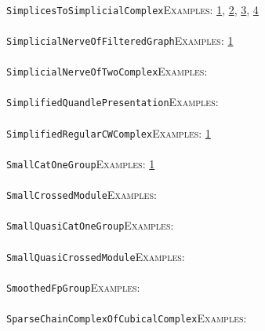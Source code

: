 \documentclass[a4paper,11pt]{report}
\begin{document}
{{ \\
 \texttt{SimplicesToSimplicialComplex}{\nobreakspace}{\nobreakspace}{\nobreakspace}{\nobreakspace}\textsc{Examples:} \href{tutorial/chap3.html} {1}{\nobreakspace}, \href{../www/SideLinks/About/aboutCoveringSpaces.html} {2}{\nobreakspace}, \href{../www/SideLinks/About/aboutCoverinSpaces.html} {3}{\nobreakspace}, \href{../www/SideLinks/About/aboutCubical.html} {4}{\nobreakspace} \\
 \\
 \texttt{SimplicialNerveOfFilteredGraph}{\nobreakspace}{\nobreakspace}{\nobreakspace}{\nobreakspace}\textsc{Examples:} \href{../www/SideLinks/About/aboutPersistent.html} {1}{\nobreakspace} \\
 \\
 \texttt{SimplicialNerveOfTwoComplex}{\nobreakspace}{\nobreakspace}{\nobreakspace}{\nobreakspace}\textsc{Examples:} \\
 \\
 \texttt{SimplifiedQuandlePresentation}{\nobreakspace}{\nobreakspace}{\nobreakspace}{\nobreakspace}\textsc{Examples:} \\
 \\
 \texttt{SimplifiedRegularCWComplex}{\nobreakspace}{\nobreakspace}{\nobreakspace}{\nobreakspace}\textsc{Examples:} \href{../www/SideLinks/About/aboutPeripheral.html} {1}{\nobreakspace} \\
 \\
 \texttt{SmallCatOneGroup}{\nobreakspace}{\nobreakspace}{\nobreakspace}{\nobreakspace}\textsc{Examples:} \href{../www/SideLinks/About/aboutquasi.html} {1}{\nobreakspace} \\
 \\
 \texttt{SmallCrossedModule}{\nobreakspace}{\nobreakspace}{\nobreakspace}{\nobreakspace}\textsc{Examples:} \\
 \\
 \texttt{SmallQuasiCatOneGroup}{\nobreakspace}{\nobreakspace}{\nobreakspace}{\nobreakspace}\textsc{Examples:} \\
 \\
 \texttt{SmallQuasiCrossedModule}{\nobreakspace}{\nobreakspace}{\nobreakspace}{\nobreakspace}\textsc{Examples:} \\
 \\
 \texttt{SmoothedFpGroup}{\nobreakspace}{\nobreakspace}{\nobreakspace}{\nobreakspace}\textsc{Examples:} \\
 \\
 \texttt{SparseChainComplexOfCubicalComplex}{\nobreakspace}{\nobreakspace}{\nobreakspace}{\nobreakspace}\textsc{Examples:} \\
}}
\end{document}
